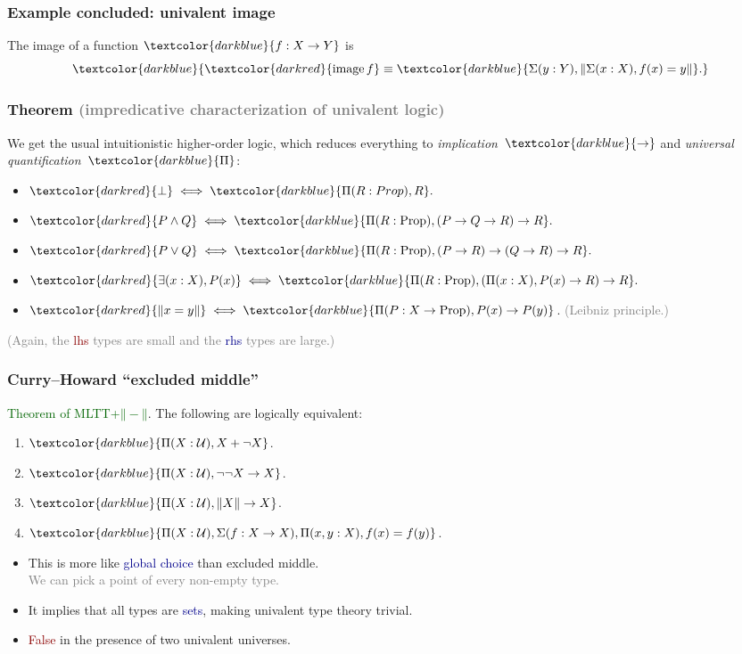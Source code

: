 \documentclass[aspectratio=169]{beamer}
\newcommand{\Prop}{\operatorname{Prop}}
\newcommand{\image}{\operatorname{image}}
\newcommand{\eqq}{\equiv}
\newcommand{\U}{\operatorname{\mathcal{U}}}
\newcommand{\db}{\textcolor{darkblue}}
\newcommand{\dg}{\textcolor{darkgreen}}
\newcommand{\grey}{\textcolor{grey}}
\newcommand{\dr}{\textcolor{darkred}}
\newcommand{\m}[1]{$\db{#1}$}
\newcommand{\mm}[1]{${#1}$}
\newcommand{\M}[1]{\[\db{#1}\]}
\newcommand{\trunc}[1]{{\mathord{\parallel}#1\mathord{\parallel}}}
\begin{document}
\begin{frame}
  \frametitle{Example concluded: univalent image}

The image of a function \m{f:X \to Y} is
\M{\dr{\image f} \eqq \db{\Sigma(y:Y), \trunc{\Sigma(x:X), f(x)=y}}.}


\end{frame}


\begin{frame}
  \frametitle{Theorem \grey{(impredicative characterization of univalent logic)}}

We get the usual intuitionistic higher-order logic, which reduces everything to \emph{implication}~\m{\to} and \emph{universal quantification}~\m{\Pi}:

  \begin{itemize}
  \item \vfill \mm{\dr{\bot} \iff \db{\Pi(R:Prop), R}.}
  \item \vfill \mm{\dr{P \wedge Q} \iff \db{\Pi(R:\Prop), (P \to Q \to R) \to R}.}
  \item \vfill \mm{\dr{P \vee Q} \iff \db{\Pi(R:\Prop), (P \to R) \to (Q \to R) \to R}.}
  \item \vfill \mm{\dr{\exists(x:X), P(x)} \iff \db{\Pi(R:\Prop), (\Pi(x:X), P(x) \to R) \to R}.}
  \item \vfill \mm{\dr{\trunc{x=y}} \iff \db{\Pi(P:X \to \Prop), P(x) \to P(y)}}. \grey{(Leibniz principle.)}
  \end{itemize}

\vfill

\grey{(Again, the \dr{lhs} types are small and the \db{rhs} types are large.)}

\end{frame}

\begin{frame}
  \frametitle{Curry--Howard ``excluded middle''}

\dg{Theorem of MLTT+$\trunc{-}$}. The following are logically equivalent:
\begin{enumerate}
\item \m{\Pi(X:\U), X + \neg X}.
\item \m{\Pi(X:\U), \neg \neg X \to X}.
\item \m{\Pi(X:\U), \trunc{X} \to X}.
\item \m{\Pi(X:\U), \Sigma(f:X\to X), \Pi(x,y:X), f(x)=f(y)}.
\end{enumerate}
\begin{itemize}
\item This is more like \db{global choice} than excluded middle. \\[1ex]
\grey{We can pick a point of every non-empty type.}
\item It implies that all types are \db{sets}, making univalent type theory trivial.
\item \dr{False} in the presence of two univalent universes.
\end{itemize}

\end{frame}
\end{document}
